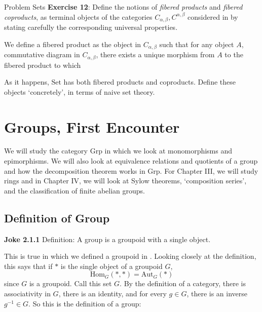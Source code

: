 \documentclass{report}
\begin{document}
\begin{exercises}{Problem Sets}
    \textbf{Exercise 12}: Define the notions of \textit{fibered products} and \textit{fibered coproducts}, as terminal objects of the categories $C_{\alpha, \beta}, C^{\alpha, \beta}$ considered in  by stating carefully the corresponding universal properties.
        \begin{answer}
            We define a fibered product as the object in $C_{\alpha, \beta}$ such that for any object $A$, commutative diagram in $C_{\alpha, \beta}$, there exists a unique morphism from $A$ to the fibered product to which 
        \end{answer}

    As it happens, $\text{Set}$ has both fibered products and coproducts. Define these objects `concretely', in terms of naive set theory.
\end{exercises}

\chapter{Groups, First Encounter}

We will study the category $\text{Grp}$ in which we look at monomorphisms and epimorphisms. We will also look at equivalence relations and quotients of a group and how the decomposition theorem works in $\text{Grp}$. For Chapter III, we will study rings and in Chapter IV, we will look at Sylow theorems, `composition series', and the classification of finite abelian groups.

\begin{topic}
    \section{Definition of Group}
\end{topic}

\textbf{Joke 2.1.1} Definition: A group is a groupoid with a single object.

This is true in which we defined a groupoid in . Looking closely at the definition, this says that if $*$ is the single object of a groupoid $G$,
    \begin{equation*}
        \text{Hom}_{G}(*, *) = \text{Aut}_{G}(*)
    \end{equation*}
since $G$ is a groupoid. Call this set $G$. By the definition of a category, there is associativity in $G$, there is an identity, and for every $g \in G$, there is an inverse $g^{-1} \in G$. So this is the definition of a group:
\end{document}
